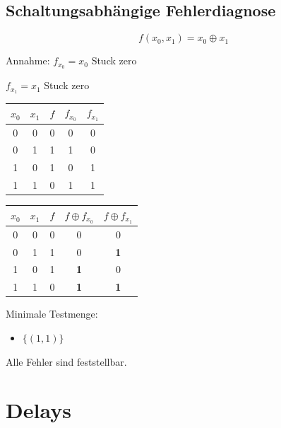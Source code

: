 \documentclass[a4paper,6pt]{article}
\begin{document}
\begin{multicols*}{3}
\subsection{Schaltungsabhängige Fehlerdiagnose}

$$
f(x_0, x_1) = x_0 \oplus x_1
$$

Annahme: \quad $f_{x_0} = x_0$ Stuck \@ zero

\qquad \qquad \qquad $f_{x_1} = x_1$ Stuck \@ zero 

\tiny
    \begin{center}
        \begin{tabular}{cc|c|cc}
            \hline
            $x_0$ & $x_1$ & $f$ & $f_{x_0}$ & $f_{x_1}$\\
            \hline
            0 & 0 & 0 & 0 & 0 \\
            0 & 1 & 1 & 1 & 0 \\
            1 & 0 & 1 & 0 & 1 \\
            1 & 1 & 0 & 1 & 1 \\
            \hline
        \end{tabular}
    \end{center}    
\scriptsize

\tiny
    \begin{center}
        \begin{tabular}{cc|c|cc}
            \hline
            $x_0$ & $x_1$ & $f$ & $f \oplus f_{x_0}$ & $f \oplus f_{x_1}$\\
            \hline
            0 & 0 & 0 & 0 & 0 \\
            0 & 1 & 1 & 0 & \textbf{1} \\
            1 & 0 & 1 & \textbf{1} & 0 \\
            1 & 1 & 0 & \textbf{1} & \textbf{1} \\
            \hline
        \end{tabular}
    \end{center}    
\scriptsize

Minimale Testmenge:

\begin{itemize}
    \item $\{(1,1)\}$
\end{itemize}
Alle Fehler sind feststellbar.

\section{Delays}


\end{multicols*}
\end{document}
